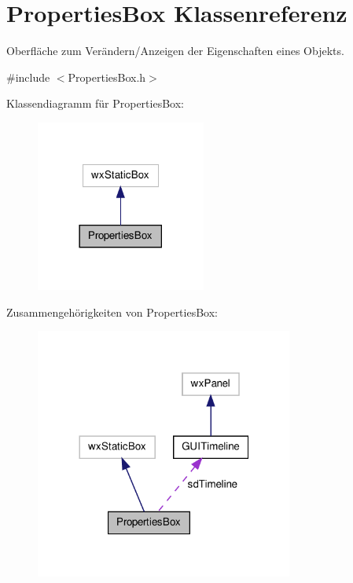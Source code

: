 \hypertarget{classPropertiesBox}{\section{Properties\-Box Klassenreferenz}
\label{classPropertiesBox}
}


Oberfläche zum Verändern/\-Anzeigen der Eigenschaften eines Objekts.  




{\ttfamily \#include $<$Properties\-Box.\-h$>$}



Klassendiagramm für Properties\-Box\-:\nopagebreak
\begin{figure}[H]
\begin{center}
\leavevmode
\includegraphics[width=158pt]{classPropertiesBox__inherit__graph}
\end{center}
\end{figure}


Zusammengehörigkeiten von Properties\-Box\-:\nopagebreak
\begin{figure}[H]
\begin{center}
\leavevmode
\includegraphics[width=240pt]{classPropertiesBox__coll__graph}
\end{center}
\end{figure}

